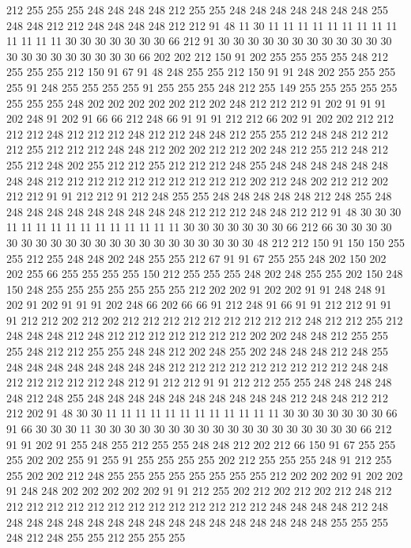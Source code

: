 212 255 255 255 248 248 248 248 212 255 255 248 248 248 248 248 248 248 255 248
248 212 212 248 248 248 248 212 212 91 48 11 30 11 11 11 11 11 11 11
11 11 11 11 11 11 30 30 30 30 30 30 30 66 212 91 30 30 30 30
30 30 30 30 30 30 30 30 30 30 30 30 30 30 30 30 30 66 202 202
212 150 91 202 255 255 255 255 248 212 255 255 255 212 150 91 67 91 48 248
255 255 212 150 91 91 248 202 255 255 255 255 91 248 255 255 255 255 91 255
255 255 248 212 255 149 255 255 255 255 255 255 255 255 248 202 202 202 202 202
212 202 248 212 212 212 91 202 91 91 91 202 248 91 202 91 66 66 212 248
66 91 91 91 212 212 66 202 91 202 202 212 212 212 212 248 212 212 212 248
212 212 248 248 212 255 255 212 248 248 212 212 212 255 212 212 212 248 248 212
202 202 212 212 202 248 212 255 212 248 212 255 212 248 202 255 212 212 255 212
212 212 248 255 248 248 248 248 248 248 248 248 212 212 212 212 212 212 212 212
212 212 202 212 248 202 212 212 202 212 212 91 91 212 212 91 212 248 255 255
248 248 248 248 248 212 248 255 248 248 248 248 248 248 248 248 248 248 212 212
212 248 248 212 212 91 48 30 30 30 11 11 11 11 11 11 11 11 11 11
11 11 30 30 30 30 30 30 30 66 212 66 30 30 30 30 30 30 30 30
30 30 30 30 30 30 30 30 30 30 30 30 30 48 212 212 150 91 150 150
255 255 212 255 248 248 202 248 255 255 212 67 91 91 67 255 255 248 202 150
202 202 255 66 255 255 255 255 150 212 255 255 255 248 202 248 255 255 202 150
248 150 248 255 255 255 255 255 255 255 212 202 202 91 202 202 91 91 248 248
91 202 91 202 91 91 91 202 248 66 202 66 66 91 212 248 91 66 91 91
212 212 91 91 91 212 212 202 212 202 212 212 212 212 212 212 212 212 212 248
212 212 255 212 248 248 248 212 248 212 212 212 212 212 212 212 202 202 248 248
212 255 255 255 248 212 212 255 255 248 248 212 202 248 255 202 248 248 248 212
248 255 248 248 248 248 248 248 248 248 212 212 212 212 212 212 212 212 212 248
248 212 212 212 212 212 248 212 91 212 212 91 91 212 212 255 255 248 248 248
248 248 212 248 255 248 248 248 248 248 248 248 248 248 248 212 248 248 212 212
212 202 91 48 30 30 11 11 11 11 11 11 11 11 11 11 11 11 30 30
30 30 30 30 30 66 91 66 30 30 30 11 30 30 30 30 30 30 30 30
30 30 30 30 30 30 30 30 30 30 66 212 91 91 202 91 255 248 255 212
255 255 248 248 212 202 212 66 150 91 67 255 255 255 202 202 255 91 255 91
255 255 255 255 202 212 255 255 255 248 91 212 255 255 202 202 212 248 255 255
255 255 255 255 255 255 212 202 202 202 91 202 202 91 248 248 202 202 202 202
202 91 91 212 255 202 212 202 212 202 212 248 212 212 212 212 212 212 212 212
212 212 212 212 212 212 248 248 248 248 212 248 248 248 248 248 248 248 248 248
248 248 248 248 248 248 248 248 255 255 255 248 212 248 255 255 212 255 255 255
